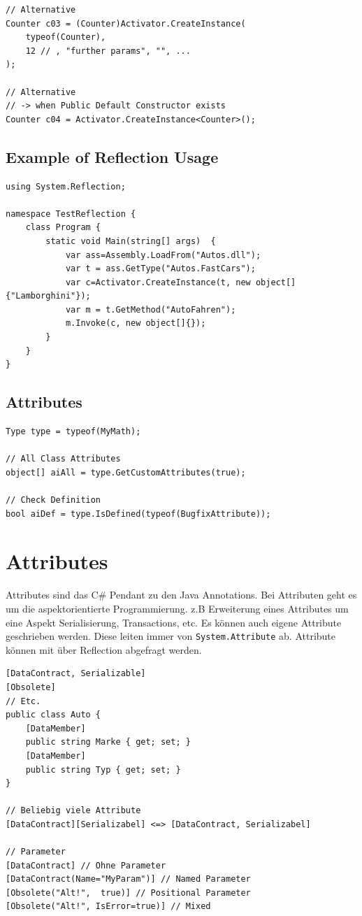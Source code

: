 \documentclass[
a4paper,
oneside,
10pt,
fleqn,
headsepline,
toc=listofnumbered, 
bibliography=totocnumbered]{scrartcl}
\let\stdsection\section
\renewcommand\section{\clearpage\stdsection}
\begin{document}
\begin{lstlisting}[caption=Reflection: Constructor Info Alternative via Activator]
// Alternative
Counter c03 = (Counter)Activator.CreateInstance(
	typeof(Counter),
	12 // , "further params", "", ...
);

// Alternative
// -> when Public Default Constructor exists
Counter c04 = Activator.CreateInstance<Counter>();
\end{lstlisting}

\subsection{Example of Reflection Usage}
\begin{lstlisting}
using System.Reflection;

namespace TestReflection {
    class Program {
        static void Main(string[] args)  {
            var ass=Assembly.LoadFrom("Autos.dll");
            var t = ass.GetType("Autos.FastCars");
            var c=Activator.CreateInstance(t, new object[] {"Lamborghini"});
            var m = t.GetMethod("AutoFahren");
            m.Invoke(c, new object[]{});
        }
    }
} 
\end{lstlisting}

\subsection{Attributes}
\begin{lstlisting}[caption=Reflection: Attributes]
Type type = typeof(MyMath);

// All Class Attributes
object[] aiAll = type.GetCustomAttributes(true);

// Check Definition
bool aiDef = type.IsDefined(typeof(BugfixAttribute));
\end{lstlisting}

\section{Attributes}
Attributes sind das C\# Pendant zu den Java Annotations. Bei Attributen geht es um die aspektorientierte Programmierung. z.B Erweiterung eines Attributes um eine Aspekt Serialisierung, Transactions, etc. Es können auch eigene Attribute geschrieben werden. Diese leiten immer von \lstinline|System.Attribute| ab. Attribute können mit über Reflection abgefragt werden.
\begin{lstlisting}[caption=Attributes]
[DataContract, Serializable]
[Obsolete]
// Etc.
public class Auto {
	[DataMember]
	public string Marke { get; set; }
	[DataMember]
	public string Typ { get; set; }
}

// Beliebig viele Attribute
[DataContract][Serializabel] <=> [DataContract, Serializabel]

// Parameter
[DataContract] // Ohne Parameter
[DataContract(Name="MyParam")] // Named Parameter
[Obsolete("Alt!",  true)] // Positional Parameter
[Obsolete("Alt!", IsError=true)] // Mixed
\end{lstlisting}
\end{document}
